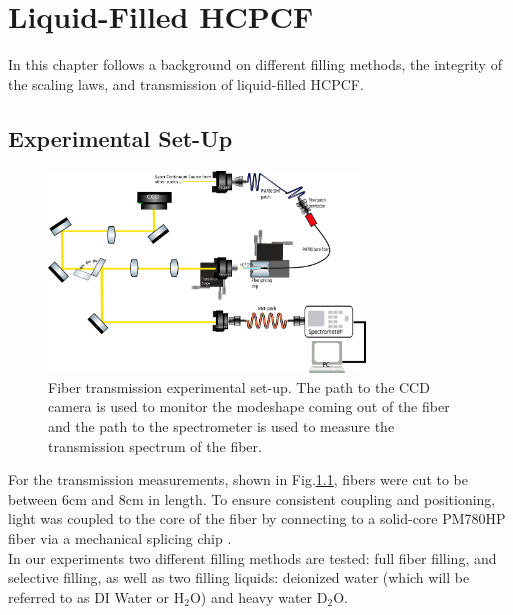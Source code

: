 \chapter{Liquid-Filled HCPCF}
In this chapter follows a background on different filling methods, the integrity of the scaling laws, and transmission of liquid-filled HCPCF.
\section{Experimental Set-Up}
\begin{figure}[!htb]
	\centering
	\includegraphics[width=0.75\textwidth]{./Figures/fiberfilling/Transmission_SetUp.png}
	\caption{Fiber transmission experimental set-up. The path to the CCD camera is used to monitor the modeshape coming out of the fiber and the path to the spectrometer is used to measure the transmission spectrum of the fiber.}
	\label{fig:filling exp}
\end{figure}
For the transmission measurements, shown in Fig.\ref{fig:filling exp}, fibers were cut to be between 6cm and 8cm in length. To ensure consistent coupling and positioning, light was coupled to the core of the fiber by connecting to a solid-core PM780HP fiber via a mechanical splicing chip \cite{maruf}.\\
In our experiments two different filling methods are tested: full fiber filling, and selective filling, as well as two filling liquids: deionized water (which will be referred to as DI Water or H${}_2$O) and heavy water D${}_2$O.
